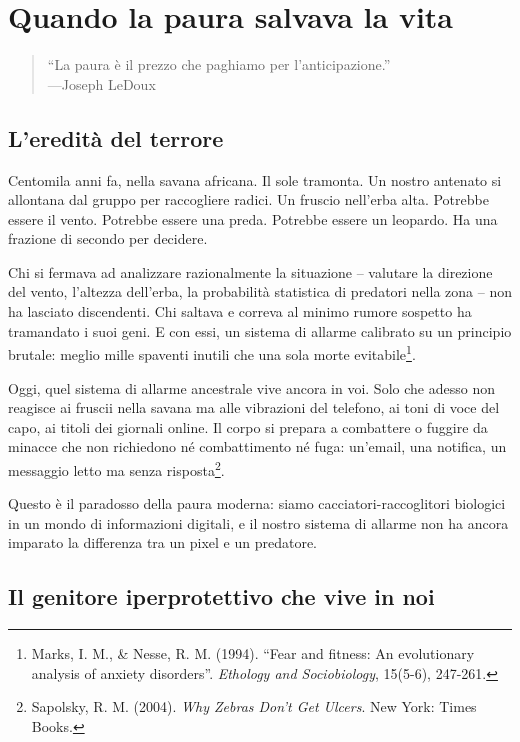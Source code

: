 \chapter{Quando la paura salvava la vita}

\begin{quotation}
``La paura è il prezzo che paghiamo per l'anticipazione.''\\
---Joseph LeDoux
\end{quotation}

\section{L'eredità del terrore}

Centomila anni fa, nella savana africana. Il sole tramonta. Un nostro antenato si allontana dal gruppo per raccogliere radici. Un fruscio nell'erba alta. Potrebbe essere il vento. Potrebbe essere una preda. Potrebbe essere un leopardo. Ha una frazione di secondo per decidere.

Chi si fermava ad analizzare razionalmente la situazione -- valutare la direzione del vento, l'altezza dell'erba, la probabilità statistica di predatori nella zona -- non ha lasciato discendenti. Chi saltava e correva al minimo rumore sospetto ha tramandato i suoi geni. E con essi, un sistema di allarme calibrato su un principio brutale: meglio mille spaventi inutili che una sola morte evitabile\footnote{Marks, I. M., \& Nesse, R. M. (1994). ``Fear and fitness: An evolutionary analysis of anxiety disorders''. \textit{Ethology and Sociobiology}, 15(5-6), 247-261.}.

Oggi, quel sistema di allarme ancestrale vive ancora in voi. Solo che adesso non reagisce ai fruscii nella savana ma alle vibrazioni del telefono, ai toni di voce del capo, ai titoli dei giornali online. Il corpo si prepara a combattere o fuggire da minacce che non richiedono né combattimento né fuga: un'email, una notifica, un messaggio letto ma senza risposta\footnote{Sapolsky, R. M. (2004). \textit{Why Zebras Don't Get Ulcers}. New York: Times Books.}. 

Questo è il paradosso della paura moderna: siamo cacciatori-raccoglitori biologici in un mondo di informazioni digitali, e il nostro sistema di allarme non ha ancora imparato la differenza tra un pixel e un predatore.


\section{Il genitore iperprotettivo che vive in noi}

